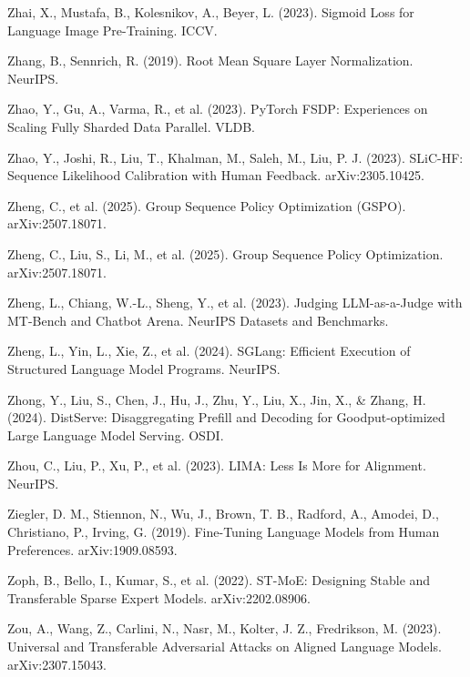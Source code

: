 {\begin{enumerate}[leftmargin=*,itemsep=1pt,label={[\arabic*]}]
\item Zhai, X., Mustafa, B., Kolesnikov, A., Beyer, L. (2023). Sigmoid Loss for Language Image Pre-Training. ICCV.
\item Zhang, B., Sennrich, R. (2019). Root Mean Square Layer Normalization. NeurIPS.
\item Zhao, Y., Gu, A., Varma, R., et al. (2023). PyTorch FSDP: Experiences on Scaling Fully Sharded Data Parallel. VLDB.
\item Zhao, Y., Joshi, R., Liu, T., Khalman, M., Saleh, M., Liu, P. J. (2023). SLiC-HF: Sequence Likelihood Calibration with Human Feedback. arXiv:2305.10425.
\item Zheng, C., et al. (2025). Group Sequence Policy Optimization (GSPO). arXiv:2507.18071.
\item Zheng, C., Liu, S., Li, M., et al. (2025). Group Sequence Policy Optimization. arXiv:2507.18071.
\item Zheng, L., Chiang, W.-L., Sheng, Y., et al. (2023). Judging LLM-as-a-Judge with MT-Bench and Chatbot Arena. NeurIPS Datasets and Benchmarks.
\item Zheng, L., Yin, L., Xie, Z., et al. (2024). SGLang: Efficient Execution of Structured Language Model Programs. NeurIPS.
\item Zhong, Y., Liu, S., Chen, J., Hu, J., Zhu, Y., Liu, X., Jin, X., \& Zhang, H. (2024). DistServe: Disaggregating Prefill and Decoding for Goodput-optimized Large Language Model Serving. OSDI.
\item Zhou, C., Liu, P., Xu, P., et al. (2023). LIMA: Less Is More for Alignment. NeurIPS.
\item Ziegler, D. M., Stiennon, N., Wu, J., Brown, T. B., Radford, A., Amodei, D., Christiano, P., Irving, G. (2019). Fine-Tuning Language Models from Human Preferences. arXiv:1909.08593.
\item Zoph, B., Bello, I., Kumar, S., et al. (2022). ST-MoE: Designing Stable and Transferable Sparse Expert Models. arXiv:2202.08906.
\item Zou, A., Wang, Z., Carlini, N., Nasr, M., Kolter, J. Z., Fredrikson, M. (2023). Universal and Transferable Adversarial Attacks on Aligned Language Models. arXiv:2307.15043.
\end{enumerate}}
